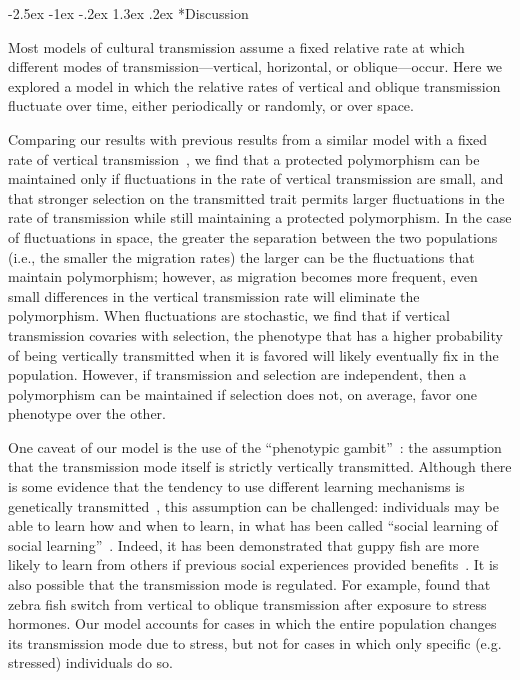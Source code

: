 \documentclass[14pt]{extarticle}
\makeatletter
\renewcommand\section{\@startsection {section}{1}{\z@}%
     {-2.5ex \@plus -1ex \@minus -.2ex}%
     {1.3ex \@plus.2ex}%
    {\Large\bfseries}}
\makeatother
\begin{document}
\section*{Discussion}

Most models of cultural transmission assume a fixed relative rate at which different modes of transmission---vertical, horizontal, or oblique---occur.
Here we explored a model in which the relative rates of vertical and oblique transmission fluctuate over time, either periodically or randomly, or over space.

Comparing our results with previous results from a similar model with a fixed rate of vertical transmission~\citep{Ram2018}, we find that a protected polymorphism can be maintained only if fluctuations in the rate of vertical transmission are small, and that stronger selection on the transmitted trait permits larger fluctuations in the rate of transmission while still maintaining a protected polymorphism. 
In the case of fluctuations in space, the greater the separation between the two populations (i.e., the smaller the migration rates) the larger can be the fluctuations that maintain polymorphism; however, as migration becomes more frequent, even small differences in the vertical transmission rate will eliminate the polymorphism.
When fluctuations are stochastic, we find that if vertical transmission covaries with selection, the phenotype that has a higher probability of being vertically transmitted  when it is favored will likely eventually fix in the population.
However, if transmission and selection are independent, then a polymorphism can be maintained if selection does not, on average, favor one phenotype over the other.

One caveat of our model is the use of the ``phenotypic gambit''~\citep{Grafen1984}: the assumption that the transmission mode itself is strictly vertically transmitted.
Although there is some evidence that the tendency to use different learning mechanisms is genetically transmitted~\citep{Foucaud2013}, this assumption can be challenged: individuals may be able to learn how and when to learn, in what has been called ``social learning of social learning''~\citep{Mesoudi2016}.
Indeed, it has been demonstrated that guppy fish are more likely to learn from others if previous social experiences provided benefits~\citep{Leris2016}.
It is also possible that the transmission mode is regulated.
For example, \citet{Farine2015} found that zebra fish switch from vertical to oblique transmission after exposure to stress hormones.
Our model accounts for cases in which the entire population changes its transmission mode due to stress, but not for cases in which only {\color{red}specific (e.g. stressed)} individuals do so.
\end{document}
